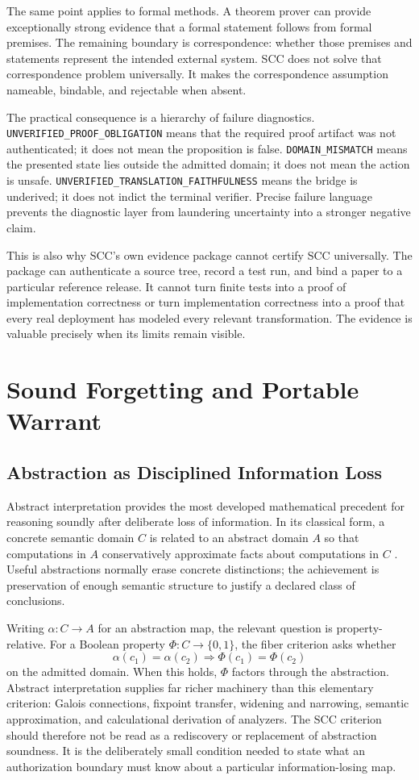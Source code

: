 \documentclass[11pt]{article}
\begin{document}
The same point applies to formal methods. A theorem prover can provide exceptionally strong evidence that a formal statement follows from formal premises. The remaining boundary is correspondence: whether those premises and statements represent the intended external system. SCC does not solve that correspondence problem universally. It makes the correspondence assumption nameable, bindable, and rejectable when absent.

The practical consequence is a hierarchy of failure diagnostics. \texttt{UNVERIFIED\_PROOF\_OBLIGATION} means that the required proof artifact was not authenticated; it does not mean the proposition is false. \texttt{DOMAIN\_MISMATCH} means the presented state lies outside the admitted domain; it does not mean the action is unsafe. \texttt{UNVERIFIED\_TRANSLATION\_FAITHFULNESS} means the bridge is underived; it does not indict the terminal verifier. Precise failure language prevents the diagnostic layer from laundering uncertainty into a stronger negative claim.

This is also why SCC's own evidence package cannot certify SCC universally. The package can authenticate a source tree, record a test run, and bind a paper to a particular reference release. It cannot turn finite tests into a proof of implementation correctness or turn implementation correctness into a proof that every real deployment has modeled every relevant transformation. The evidence is valuable precisely when its limits remain visible.

\section{Sound Forgetting and Portable Warrant}
\subsection{Abstraction as Disciplined Information Loss}
Abstract interpretation provides the most developed mathematical precedent for reasoning soundly after deliberate loss of information. In its classical form, a concrete semantic domain $C$ is related to an abstract domain $A$ so that computations in $A$ conservatively approximate facts about computations in $C$ \cite{cousot1977abstract}. Useful abstractions normally erase concrete distinctions; the achievement is preservation of enough semantic structure to justify a declared class of conclusions.

Writing $\alpha:C\rightarrow A$ for an abstraction map, the relevant question is property-relative. For a Boolean property $\Phi:C\rightarrow\{0,1\}$, the fiber criterion asks whether
\[
\alpha(c_1)=\alpha(c_2)\Longrightarrow \Phi(c_1)=\Phi(c_2)
\]
on the admitted domain. When this holds, $\Phi$ factors through the abstraction. Abstract interpretation supplies far richer machinery than this elementary criterion: Galois connections, fixpoint transfer, widening and narrowing, semantic approximation, and calculational derivation of analyzers. The SCC criterion should therefore not be read as a rediscovery or replacement of abstraction soundness. It is the deliberately small condition needed to state what an authorization boundary must know about a particular information-losing map.
\end{document}
